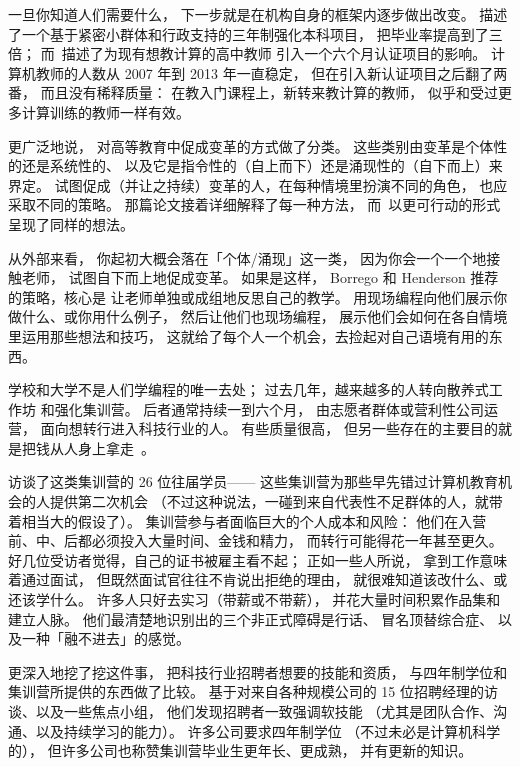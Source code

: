 一旦你知道人们需要什么，
下一步就是在机构自身的框架内逐步做出改变。
\cite{Nara2018}描述了一个基于紧密小群体和行政支持的三年制强化本科项目，
把毕业率提高到了三倍；
而~\cite{Hu2017}描述了为现有想教计算的高中教师
引入一个六个月认证项目的影响。
计算机教师的人数从 2007 年到 2013 年一直稳定，
但在引入新认证项目之后翻了两番，
而且没有稀释质量：
在教入门课程上，新转来教计算的教师，
似乎和受过更多计算训练的教师一样有效。

更广泛地说，
\cite{Borr2014}对高等教育中促成变革的方式做了分类。
这些类别由变革是个体性的还是系统性的、
以及它是指令性的（自上而下）还是涌现性的（自下而上）来界定。
试图促成（并让之持续）变革的人，在每种情境里扮演不同的角色，
也应采取不同的策略。
那篇论文接着详细解释了每一种方法，
而~\cite{Hend2015a,Hend2015b}以更可行动的形式呈现了同样的想法。

从外部来看，
你起初大概会落在「个体/涌现」这一类，
因为你会一个一个地接触老师，
试图自下而上地促成变革。
如果是这样，
Borrego 和 Henderson 推荐的策略，核心是
让老师单独或成组地反思自己的教学。
用现场编程向他们展示你做什么、或你用什么例子，
然后让他们也现场编程，
展示他们会如何在各自情境里运用那些想法和技巧，
这就给了每个人一个机会，去捡起对自己语境有用的东西。


学校和大学不是人们学编程的唯一去处；
过去几年，越来越多的人转向散养式工作坊
和强化集训营。
后者通常持续一到六个月，
由志愿者群体或营利性公司运营，
面向想转行进入科技行业的人。
有些质量很高，
但另一些存在的主要目的就是把钱从人身上拿走~\cite{McMi2017}。

\cite{Thay2017}访谈了这类集训营的 26 位往届学员——
这些集训营为那些早先错过计算机教育机会的人提供第二次机会
（不过这种说法，一碰到来自代表性不足群体的人，就带着相当大的假设了）。
集训营参与者面临巨大的个人成本和风险：
他们在入营前、中、后都必须投入大量时间、金钱和精力，
而转行可能得花一年甚至更久。
好几位受访者觉得，自己的证书被雇主看不起；
正如一些人所说，
拿到工作意味着通过面试，
但既然面试官往往不肯说出拒绝的理由，
就很难知道该改什么、或还该学什么。
许多人只好去实习（带薪或不带薪），
并花大量时间积累作品集和建立人脉。
他们最清楚地识别出的三个非正式障碍是行话、
冒名顶替综合症、
以及一种「融不进去」的感觉。

\cite{Burk2018}更深入地挖了挖这件事，
把科技行业招聘者想要的技能和资质，
与四年制学位和集训营所提供的东西做了比较。
基于对来自各种规模公司的 15 位招聘经理的访谈、以及一些焦点小组，
他们发现招聘者一致强调软技能
（尤其是团队合作、沟通、以及持续学习的能力）。
许多公司要求四年制学位
（不过未必是计算机科学的），
但许多公司也称赞集训营毕业生更年长、更成熟，
并有更新的知识。

